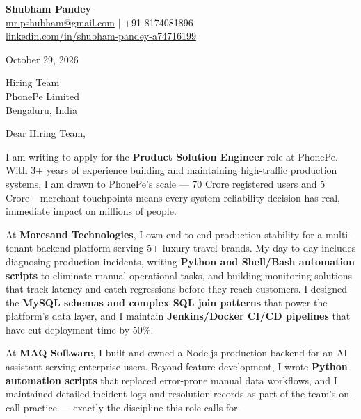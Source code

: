 \documentclass[a4paper,11pt]{article}
\begin{document}
\begin{center}
  {\LARGE \textbf{Shubham Pandey}} \\[4pt]
  \href{mailto:mr.pshubham@gmail.com}{mr.pshubham@gmail.com} \quad | \quad +91-8174081896 \\
  \href{https://www.linkedin.com/in/shubham-pandey-a74716199/}{linkedin.com/in/shubham-pandey-a74716199}
\end{center}

\vspace{8pt}

October 29, 2026

\vspace{8pt}

Hiring Team \\
PhonePe Limited \\
Bengaluru, India

\vspace{12pt}

Dear Hiring Team,

\vspace{8pt}

I am writing to apply for the \textbf{Product Solution Engineer} role at PhonePe. With 3+ years of experience building and maintaining high-traffic production systems, I am drawn to PhonePe's scale --- 70 Crore registered users and 5 Crore+ merchant touchpoints means every system reliability decision has real, immediate impact on millions of people.

\vspace{8pt}

At \textbf{Moresand Technologies}, I own end-to-end production stability for a multi-tenant backend platform serving 5+ luxury travel brands. My day-to-day includes diagnosing production incidents, writing \textbf{Python and Shell/Bash automation scripts} to eliminate manual operational tasks, and building monitoring solutions that track latency and catch regressions before they reach customers. I designed the \textbf{MySQL schemas and complex SQL join patterns} that power the platform's data layer, and I maintain \textbf{Jenkins/Docker CI/CD pipelines} that have cut deployment time by 50\%.

\vspace{8pt}

At \textbf{MAQ Software}, I built and owned a Node.js production backend for an AI assistant serving enterprise users. Beyond feature development, I wrote \textbf{Python automation scripts} that replaced error-prone manual data workflows, and I maintained detailed incident logs and resolution records as part of the team's on-call practice --- exactly the discipline this role calls for.
\end{document}
